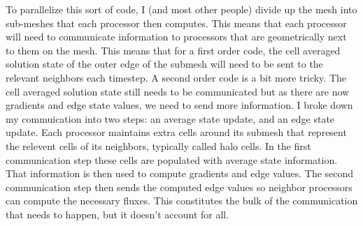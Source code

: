 \documentclass[12pt,parskip=full]{article}
\numberwithin{subsection}{section}
\begin{document}
		To parallelize this sort of code, I (and most other people) divide up the mesh into sub-meshes that each processor then computes.
		This means that each processor will need to communicate information to processors that are geometrically next to them on the 
		mesh. This means that for a first order code, the cell averaged solution state of the outer edge of the submesh will need to be
		sent to the relevant neighbors each timestep. A second order code is a bit more tricky. The cell averaged solution state still
		needs to be communicated but as there are now gradients and edge state values, we need to send more information. I broke down my
		commuication into two steps: an average state update, and an edge state update. Each processor maintains extra cells around its
		submesh that represent the relevent cells of its neighbors, typically called halo cells. In the first communication step these
		cells are populated with average state information. That information is then used to compute gradients and edge values. The
		second communication step then sends the computed edge values so neighbor processors can compute the necessary fluxes.
		This constitutes the bulk of the communication that needs to happen, but it doesn't account for all.
\end{document}
